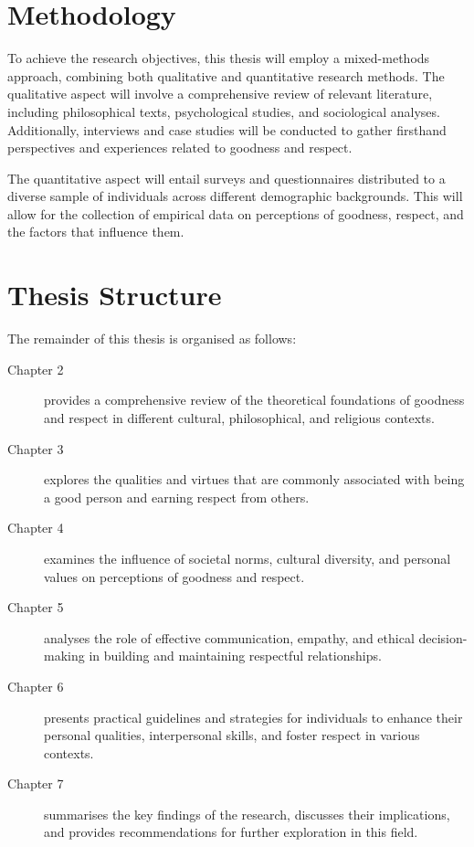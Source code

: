 \section{Methodology}
To achieve the research objectives, this thesis will employ a mixed-methods approach, combining both qualitative and quantitative research methods. The qualitative aspect will involve a comprehensive review of relevant literature, including philosophical texts, psychological studies, and sociological analyses. Additionally, interviews and case studies will be conducted to gather firsthand perspectives and experiences related to goodness and respect.

The quantitative aspect will entail surveys and questionnaires distributed to a diverse sample of individuals across different demographic backgrounds. This will allow for the collection of empirical data on perceptions of goodness, respect, and the factors that influence them.

\section{Thesis Structure}
The remainder of this thesis is organised as follows:

\begin{description}
  \item[Chapter 2] provides a comprehensive review of the theoretical foundations of goodness and respect in different cultural, philosophical, and religious contexts.
  \item[Chapter 3] explores the qualities and virtues that are commonly associated with being a good person and earning respect from others.
  \item[Chapter 4] examines the influence of societal norms, cultural diversity, and personal values on perceptions of goodness and respect.
  \item[Chapter 5] analyses the role of effective communication, empathy, and ethical decision-making in building and maintaining respectful relationships.
  \item[Chapter 6] presents practical guidelines and strategies for individuals to enhance their personal qualities, interpersonal skills, and foster respect in various contexts.
  \item[Chapter 7] summarises the key findings of the research, discusses their implications, and provides recommendations for further exploration in this field.
\end{description}

